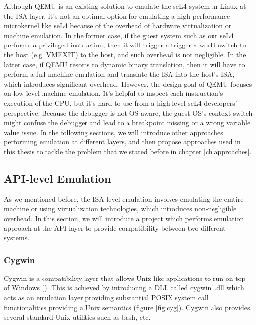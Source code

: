 Although QEMU is an existing solution to emulate the seL4 system in Linux at the ISA layer, it's not an optimal option for emulating a high-performance microkernel like seL4 because of the overhead of hardware virtualization or machine emulation. In the former case, if the guest system such as our seL4 performs a privileged instruction, then it will trigger a trigger a world switch to the host (e.g. VMEXIT) to the host, and such overhead is not negligible. In the latter case, if QEMU resorts to dynamic binary translation, then it will have to perform a full machine emulation and translate the ISA into the host's ISA, which introduces significant overhead. However, the design goal of QEMU focuses on low-level machine emulation. It's helpful to inspect each instruction's execution of the CPU, but it's hard to use from a high-level seL4 developers' perspective. Because the debugger is not OS aware, the guest OS's context switch might confuse the debugger and lead to a breakpoint missing or a wrong variable value issue. In the following sections, we will introduce other approaches performing emulation at different layers, and then propose approaches used in this thesis to tackle the problem that we stated before in chapter \ref{ch:approaches}.

\subsection{API-level Emulation}

As we mentioned before, the ISA-level emulation involves emulating the emtire machine or using virtualization technologies, which introduces non-negligible overhead. In this section, we will introduce a project which performs emulation approach at the API layer to provide compatibility between two different systems.

\subsubsection{Cygwin}


Cygwin is a compatibility layer that allows Unix-like applications to run on top of Windows (\cite{enwikicygwin}). This is achieved by introducing a DLL called cygwin1.dll which acts as an emulation layer providing substantial POSIX system call functionalities providing a Unix semantics (figure \ref{fig:cyg}). Cygwin also provides several standard Unix utilities such as bash, etc.

